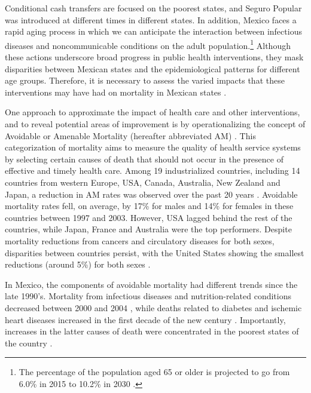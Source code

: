 \documentclass{bmcart}
\begin{document}
Conditional cash transfers are focused on the poorest states, and Seguro Popular was introduced at different times in different states. In addition, Mexico faces a rapid aging process in which we can anticipate the interaction between infectious diseases and noncommunicable conditions \cite{Bygbjerg1499} on the adult population.\footnote{The percentage of the population aged 65 or older is projected to go from 6.0\% in 2015 to 10.2\% in 2030 \cite{CONAPO}.} Although these actions underscore broad progress in public health interventions, they mask disparities between Mexican states and the epidemiological patterns for different age groups. Therefore, it is necessary to assess the varied impacts that these interventions may have had on mortality in Mexican states \cite{urquieta2015evolution}. 

 
 One approach to approximate the impact of health care and other interventions, and to reveal potential areas of improvement is by operationalizing the
 concept of Avoidable or Amenable Mortality (hereafter abbreviated AM)
 \cite{nolte&mckee2004, nolte&mckee2008,elo2014}. This categorization of mortality aims to measure the quality of health service systems by selecting certain
 causes of death that should not occur in the presence of effective and
 timely health care. Among 19 industrialized countries, including 14 countries from western Europe, USA, Canada, Australia, New Zealand and Japan, a reduction in AM rates was
 observed over the past 20 years
 \cite{nolte&mckee2008}. Avoidable mortality rates fell, on average, by 17\%
 for males and 14\% for females in these countries between 1997 and 2003. However, USA lagged behind the rest of the countries, while Japan, France and Australia were the top performers. Despite mortality reductions from cancers and circulatory diseases for
 both sexes, disparities between countries persist, with the United
 States showing the smallest reductions (around 5\%) for both sexes  \cite{nolte&mckee2008}. 
 
 In Mexico, the components of avoidable mortality had different trends since the
late 1990's. Mortality from infectious diseases and nutrition-related conditions decreased between 2000 and 2004 \cite{francomarina2006}, while deaths related to diabetes and ischemic heart diseases increased in the first decade of the new century \cite{davila2014mortalidad}. Importantly, increases in the latter causes
of death were concentrated in the poorest states of the country
\cite{davila2014mortalidad}. 
\end{document}
